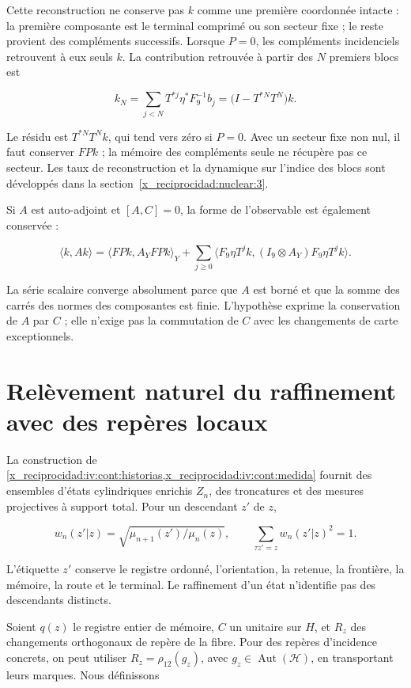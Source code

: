 Cette reconstruction ne conserve pas \(k\) comme une première coordonnée intacte : la première composante est le terminal comprimé ou son secteur fixe ; le reste provient des compléments successifs. Lorsque \(P=0\), les compléments incidenciels retrouvent à eux seuls \(k\). La contribution retrouvée à partir des \(N\) premiers blocs est

\[
k_N=\sum_{j<N}T^{*j}\eta^*F_9^{-1}b_j
=\bigl(I-T^{*N}T^N\bigr)k.
\]

Le résidu est \(T^{*N}T^Nk\), qui tend vers zéro si \(P=0\). Avec un secteur fixe non nul, il faut conserver \(FPk\) ; la mémoire des compléments seule ne récupère pas ce secteur. Les taux de reconstruction et la dynamique sur l’indice des blocs sont développés dans la section~\ref{x_reciprocidad:nuclear:3}.

Si \(A\) est auto-adjoint et \([A,C]=0\), la forme de l’observable est également conservée :

\[
\langle k,Ak\rangle
=\langle FPk,A_YFPk\rangle_Y
+\sum_{j\ge0}\langle F_9\eta T^jk,(I_9\otimes A_Y)F_9\eta T^jk\rangle.
\]

La série scalaire converge absolument parce que \(A\) est borné et que la somme des carrés des normes des composantes est finie. L’hypothèse exprime la conservation de \(A\) par \(C\) ; elle n’exige pas la commutation de \(C\) avec les changements de carte exceptionnels.


\section{Relèvement naturel du raffinement avec des repères locaux}\label{x_reciprocidad:nuc05:refinamiento}

La construction de \cref{x_reciprocidad:iv:cont:historias,x_reciprocidad:iv:cont:medida} fournit des ensembles d’états cylindriques enrichis \(Z_n\), des troncatures et des mesures projectives à support total. Pour un descendant \(z'\) de \(z\),

\[
w_n(z'|z)=\sqrt{\mu_{n+1}(z')/\mu_n(z)},\qquad
\sum_{\tau z'=z}w_n(z'|z)^2=1.
\]

L’étiquette \(z'\) conserve le registre ordonné, l’orientation, la retenue, la frontière, la mémoire, la route et le terminal. Le raffinement d’un état n’identifie pas des descendants distincts.

Soient \(q(z)\) le registre entier de mémoire, \(C\) un unitaire sur \(H\), et \(R_z\) des changements orthogonaux de repère de la fibre. Pour des repères d’incidence concrets, on peut utiliser \(R_z=\rho_{12}(g_z)\), avec \(g_z\in\operatorname{Aut}(\mathcal H)\), en transportant leurs marques. Nous définissons

